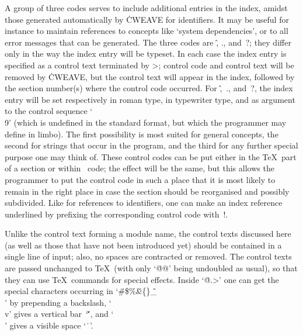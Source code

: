 A group of three codes serves to include additional entries in the index,
amidst those generated automatically by \.{CWEAVE} for identifiers. It may
be useful for instance to maintain references to concepts like `system
dependencies', or to all error messages that can be generated. The three
codes are \:\^, \:., and~\:?; they differ only in the way the index entry
will be typeset. In each case the index entry is specified as a control text
terminated by \:>; control code and control text will be removed by
\.{CWEAVE}, but the control text will appear in the index, followed by the
section number(s) where the control code occurred.  For \:\^,~\:., and~\:?,
the index entry will be set respectively in roman type, in typewriter type,
and as argument to the control sequence `\.{\\9}' (which is undefined in the
standard format, but which the programmer may define in limbo). The first
possibility is most suited for general concepts, the second for strings that
occur in the program, and the third for any further special purpose one may
think of.  These control codes can be put either in the \TeX~part of a
section or within \Cee~code; the effect will be the same, but this allows
the programmer to put the control code in such a place that it is most
likely to remain in the right place in case the section should be
reorganised and possibly subdivided. Like for references to identifiers, one
can make an index reference underlined by prefixing the corresponding
control code with~\:!.

Unlike the control text forming a module name, the control texts discussed
here (as well as those that have not been introduced yet) should be
contained in a single line of input; also, no spaces are contracted or
removed. The control texts are passed unchanged to \TeX\ (with only `\.{@@}'
being undoubled as usual), so that they can use \TeX~commands for special
effects. Inside `\.{@.\dots@>}' one can get the special characters occurring
in `\.{\#\$\%\^\&\{\}\~\_\\}' by prepending a backslash, `\.{\\v}' gives a
vertical bar~`\.\v', and `\.{\\ }' gives a visible space `\.\ '.


